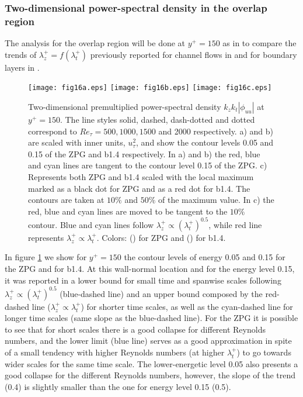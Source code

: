 \subsubsection{Two-dimensional power-spectral density in the overlap region}
The analysis for the overlap region will be done at $y^+=150$ as in \cite{tanarro_2020} to compare the trends of $\lambda_{z}^+=f(\lambda_{t}^+)$ previously reported for channel flows in \cite{delAlamo_jfm_2004} and for boundary layers in \cite{chandran_jfm_rapids_2017}.
\begin{figure}
\texttt{[image: fig16a.eps]}
\texttt{[image: fig16b.eps]}
\texttt{[image: fig16c.eps]}
  \caption{Two-dimensional premultiplied power-spectral density $k_z k_t |\phi_{uu}|$ at $y^+=150$. The line styles solid, dashed, dash-dotted and dotted correspond to $Re_{\tau}=500, 1000, 1500$ and 2000 respectively. a) and b) are scaled with inner units, $u_{\tau}^2$, and show the contour levels 0.05 and 0.15 of the ZPG and b1.4 respectively. In a) and b) the red, blue and cyan lines are tangent to the contour level 0.15 of the ZPG. c) Represents both ZPG and b1.4 scaled with the local maximum marked as a black dot for ZPG and as a red dot for b1.4. The contours are taken at $10\%$ and $50\%$ of the maximum value. In c) the red, blue and cyan lines are moved to be tangent to the $10\%$ contour. Blue and cyan lines follow $\lambda_z^+ \propto (\lambda_t ^{+})^{0.5} $, while red line represents $\lambda_z^+ \propto \lambda_t^+$. Colors: (\protect\blackline) for ZPG and (\protect\orangeline) for b1.4.}
\label{fig:spec2Duu_yp150}
\end{figure}
In figure \ref{fig:spec2Duu_yp150} we show for $y^+=150$ the contour levels of energy 0.05 and 0.15 for the ZPG and for b1.4. At this wall-normal location and for the energy level 0.15, it was reported in \cite{tanarro_2020} a lower bound for small time and spanwise scales following $\lambda_z^+ \propto (\lambda_t ^{+})^{0.5} $ (blue-dashed line) and an upper bound composed by the red-dashed line ($\lambda_z^+ \propto \lambda_t^+$) for shorter time scales, as well as the cyan-dashed line for longer time scales (same slope as the blue-dashed line).
For the ZPG it is possible to see that for short scales there is a good collapse for different Reynolds numbers, and the lower limit (blue line) serves as a good approximation in spite of a small tendency with higher Reynolds numbers (at higher $\lambda_t^+$) to go towards wider scales for the same time scale.
The lower-energetic level 0.05 also presents a good collapse for the different Reynolds numbers, however, the slope of the trend (0.4) is slightly smaller than the one for energy level 0.15 (0.5).

